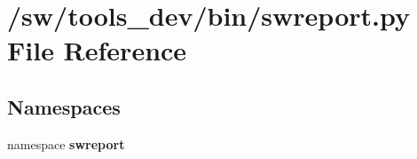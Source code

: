 \section{/sw/tools\_\-dev/bin/swreport.py File Reference}
\label{swreport_8py}
\subsection*{Namespaces}
\begin{CompactItemize}
\item 
namespace {\bf swreport}
\end{CompactItemize}
